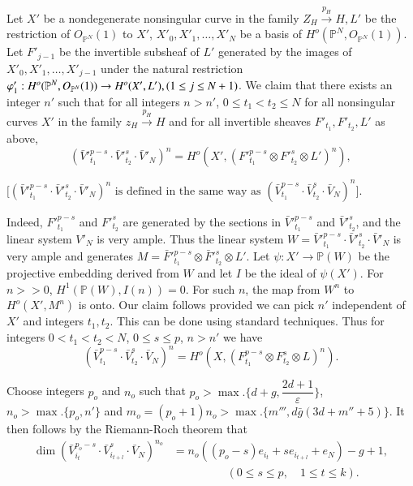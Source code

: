  Let $X'$ be a nondegenerate  nonsingular curve in the family $Z_H
 \xrightarrow{p_H} H, L'$ be the restriction of $O_{\mathbb{P}^N} (1)$
 to $X'$, $X'_0, X'_1 ,\ldots,X'_N$ be a basis of
 $H^o (\mathbb{P}^N, O_{\mathbb{P}^N} (1))$. Let $F'_{j-1}$ be the
 invertible subsheaf of $L'$ generated by the images of $X'_0, X'_1
 ,\ldots, X'_{j-1}$ under the natural restriction  
  $\varphi'_1 : H^o (\mathbb{P}^N,\break O_{\mathbb{P}^N}(1)) \to H^o
 (X', L'), (1 \le j \le N+1)$. We claim that there exists an integer
 $n'$ such that for all integers $n >n'$, $0 \le t_1 < t_2 \le N$ for
 all nonsingular curves $X'$ in the family $z_H \xrightarrow{p_H} H$ and for
 all invertible sheaves $F'_{t_1}, F'_{t_2}, L'$ as
 above,\pageoriginale   
 $$
 (\bar{V}'^{p-s}_{t_1} \cdot  \bar{V}'^s_{t_2} \cdot  \bar{V}'_N)^n = H^o (X',
 (F'^{p-s}_{t_1} \otimes F'^{s}_{t_2} \otimes L')^n),
$$

$
\bigg[(\bar{V}'^{p-s}_{t_1} \cdot  \bar{V}'^s_{t_2} \cdot  \bar{V}'_N)^n
  \text{ is defined in the same way as } (\bar{V}^{p-s}_{t_1}
  \cdot \bar{V}^s_{t_2} \cdot  \bar{V}_N)^n \bigg]. 
$

Indeed, $F'^{p-s}_{t_1}$ and $F'^{s}_{t_2}$ are generated by the
sections in $\bar{V}'^{p-s}_{t_1}$ and $\bar{V}'^{s}_{t_2}$, and the
linear system $V'_N$ is very ample. Thus the linear system $W =
\bar{V}'^{p-s}_{t_1} \cdot \bar{V}'^{s}_{t_2} \cdot  \bar{V}'_N$  is very
ample and generates $M = \bar{F}'^{p-s}_{t_1} \otimes \bar{F}'^{s}_{t_2}
\otimes L'$. Let $\psi : X' \to \mathbb{P}(W)$ be the projective
embedding derived from $W$ and let $I$ be the ideal of $\psi
(X')$. For $n >> 0$, $H^1 (\mathbb{P} (W) , I (n)) = 0 $.  For such $n$,
the map from $W^n$  to $H^o (X', M^n) $ is onto. Our claim follows
provided we can pick $n'$ independent of $X'$ and integers $t_1,
t_2$. This can be done using standard techniques. Thus for integers
$0 < t_1 < t_2 < N$, $0 \le s \le p$, $n > n'$  we have  
$$
(\bar{V}^{p-s}_{t_1} \cdot \bar{V}^{s}_{t_2} \cdot \bar{V}_N)^n = H^o 
(X,(F^{p-s}_{t_1} \otimes F^{s}_{t_2} \otimes L)^n). 
$$

\noindent
Choose integers $p_o$ and $n_o$ such that
$p_o > \max. \{d+g, \dfrac{2d+1}{\varepsilon}\}$, $n_o > \max. \{ p_o, n'\}$ and
$m_o = (p_o+1)n_o > \max.\{m''', d \bar{g} (3d+m'' + 5)\}$.
It then follows by the Riemann-Roch theorem that
\begin{align*}
 \dim (\bar{V}^{p_o-s}_{i_t} \cdot  \bar{V}^{s}_{i_{t+l}} \cdot
 \bar{V}_N)^{n_o} &= n_o ((p_o -s) e_{i_t} + se_{i_{t+l}} + e_N) -
 g+1,\\ 
& \hspace{2cm} (0\leq s \leq p, \quad 1 \leq t \leq k).
\end{align*}

